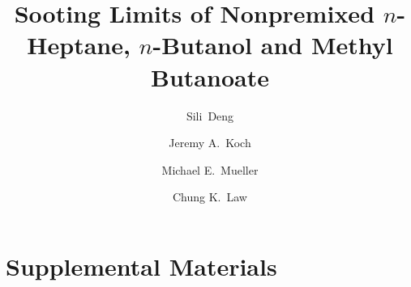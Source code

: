 \documentclass[review,3p,times]{elsarticleUS}
\begin{document}
\begin{frontmatter}

\title{Sooting Limits of Nonpremixed $n$-Heptane, $n$-Butanol and Methyl Butanoate}

\author{Sili~Deng}
\author{Jeremy A.~Koch}
\author{Michael E.~Mueller}
\author{Chung K.~Law}

\address{Department of Mechanical and Aerospace Engineering, Princeton University, Princeton, NJ 08544, USA}

\end{frontmatter}


\section*{Supplemental Materials}

\end{document}
